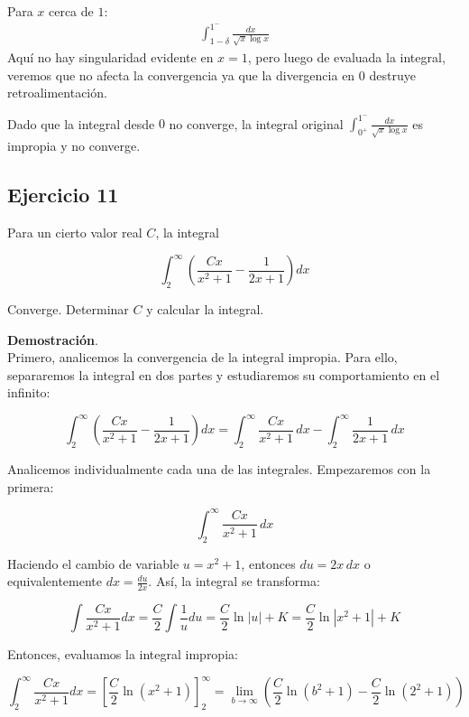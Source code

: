 \documentclass{article}
\begin{document}
    Para $x$ cerca de $1$:
    \begin{align*}
    \int_{1-\delta}^{1^-} \frac{dx}{\sqrt{x} \log x}
    \end{align*}
    Aquí no hay singularidad evidente en $x = 1$, pero luego de evaluada la integral, veremos que no afecta la convergencia ya que la divergencia en $0$ destruye retroalimentación.

    Dado que la integral desde $0$ no converge, la integral original $\int_{0^+}^{1^-} \frac{dx}{\sqrt{x} \log x}$ es impropia y no converge.



    \subsection*{Ejercicio 11}

    Para un cierto valor real $C$, la integral

    $$
    \int_{2}^{\infty}\left(\frac{C x}{x^{2}+1}-\frac{1}{2 x+1}\right) d x
    $$

    Converge. Determinar $C$ y calcular la integral.

    \textbf{Demostración}.\\

    Primero, analicemos la convergencia de la integral impropia. Para ello, separaremos la integral en dos partes y estudiaremos su comportamiento en el infinito:

    \[
    \int_{2}^{\infty}\left(\frac{C x}{x^{2}+1}-\frac{1}{2 x+1}\right) d x
    = \int_{2}^{\infty} \frac{C x}{x^2 + 1} \, dx - \int_{2}^{\infty} \frac{1}{2x + 1} \, dx
    \]

    Analicemos individualmente cada una de las integrales. Empezaremos con la primera:

    \[
    \int_{2}^{\infty} \frac{C x}{x^2 + 1} \, dx
    \]

    Haciendo el cambio de variable $u = x^2 + 1$, entonces $du = 2x \, dx$ o equivalentemente $dx = \frac{du}{2x}$. Así, la integral se transforma:

    \[
    \int \frac{C x}{x^2 + 1} dx = \frac{C}{2} \int \frac{1}{u} du = \frac{C}{2} \ln |u| + K
    = \frac{C}{2} \ln |x^2 + 1| + K
    \]

    Entonces, evaluamos la integral impropia:

    \[
    \int_{2}^{\infty} \frac{C x}{x^2 + 1} dx = \left[ \frac{C}{2} \ln(x^2 + 1) \right]_{2}^{\infty}
    = \lim_{b \to \infty} \left( \frac{C}{2} \ln(b^2 + 1) - \frac{C}{2} \ln(2^2 + 1) \right)
    \]
\end{document}
